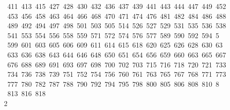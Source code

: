 \begin{tabbing}
\ 411\ 413\ 415\ 427\ 428\ 430\ 432\ 436\ 437\ 439\ 441\ 443\ 444\ 447\ 449\ 452\\[0pt]
\>\ 453\ 456\ 458\ 463\ 464\ 466\ 468\ 470\ 471\ 474\ 476\ 481\ 482\ 484\ 486\ 488\\[0pt]
\>\ 489\ 492\ 494\ 497\ 498\ 501\ 503\ 505\ 514\ 526\ 527\ 529\ 531\ 535\ 536\ 538\ \\[0pt]
\ 541\ 553\ 554\ 556\ 558\ 559\ 571\ 572\ 574\ 576\ 577\ 589\ 590\ 592\ 594\ 5\\[0pt]
\ 599\ 601\ 603\ 605\ 606\ 609\ 611\ 614\ 615\ 618\ 620\ 625\ 626\ 628\ 630\ 63\\[0pt]
\ 633\ 636\ 638\ 643\ 644\ 646\ 648\ 650\ 651\ 654\ 656\ 659\ 660\ 663\ 665\ 667\\[0pt]
\>\ 676\ 688\ 689\ 691\ 693\ 697\ 698\ 700\ 702\ 703\ 715\ 716\ 718\ 720\ 721\ 733\\[0pt]
\>\ 734\ 736\ 738\ 739\ 751\ 752\ 754\ 756\ 760\ 761\ 763\ 765\ 767\ 768\ 771\ 773\ \\[0pt]
\ 777\ 780\ 782\ 787\ 788\ 790\ 792\ 794\ 795\ 798\ 800\ 805\ 806\ 808\ 810\ 8\\[0pt]
\ 813\ 816\ 818\\[0pt]
2\>\end{tabbing}
